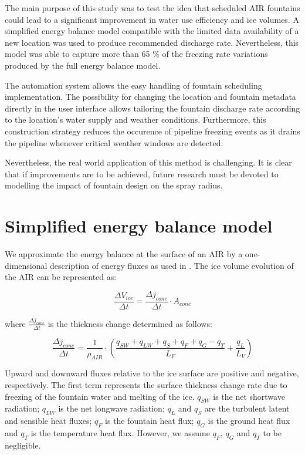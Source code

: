 \documentclass[tc, manuscript]{copernicus}
\begin{document}
The main purpose of this study was to test the idea that scheduled AIR fountains could lead to a significant
improvement in water use efficiency and ice volumes. A simplified energy balance model compatible with the
limited data availability of a new location was used to produce recommended discharge rate. Nevertheless, this
model was able to capture more than 65 \% of the freezing rate variations produced by the full energy balance
model.

The automation system allows the easy handling of fountain scheduling implementation. The possibility for
changing the location and fountain metadata directly in the user interface allows tailoring the fountain
discharge rate according to the location's water supply and weather conditions. Furthermore, this construction
strategy reduces the occurence of pipeline freezing events as it drains the pipeline whenever critical weather
windows are detected.

Nevertheless, the real world application of this method is challenging. It is clear that if improvements are to
be achieved, future research must be devoted to modelling the impact of fountain design on the spray radius.

\appendix

\section{Simplified energy balance model}

We approximate the energy balance at the surface of an AIR by a one-dimensional description of energy fluxes as
used in \cite{balasubramanianInfluenceMeteorologicalConditions2022}. The ice volume evolution of the AIR can be
represented as: 

\begin{equation}
  \frac{\Delta V_{ice}}{\Delta t}  =  \frac{\Delta j_{cone}}{ \Delta t} \cdot A_{cone}
	\label{eqn:freeze}
\end{equation}

where $\frac{\Delta j_{cone}}{\Delta t}$ is the thickness change determined as follows:

\begin{equation}
  \frac{\Delta j_{cone}}{\Delta t}  = \frac{1}{\rho_{AIR}} \cdot (\frac{q_{SW} + q_{LW} + q_{S} + q_{F} + q_{G} -
  q_{T}}{L_F} + \frac{q_{L}}{L_V} )
	\label{eqn:freeze}
\end{equation}

Upward and downward fluxes relative to the ice surface are positive and negative, respectively. The first term
represents the surface thickness change rate due to freezing of the fountain water and melting of the ice.
$q_{SW}$ is the net shortwave radiation; $q_{LW}$ is the net longwave radiation; $q_{L}$ and $q_{S}$ are the
turbulent latent and sensible heat fluxes; $q_{F}$ is the fountain heat flux; $q_{G}$ is the ground heat flux
and $q_{T}$ is the temperature heat flux. However, we assume $q_{F}$, $q_{G}$ and $q_{T}$ to be negligible.
\end{document}

